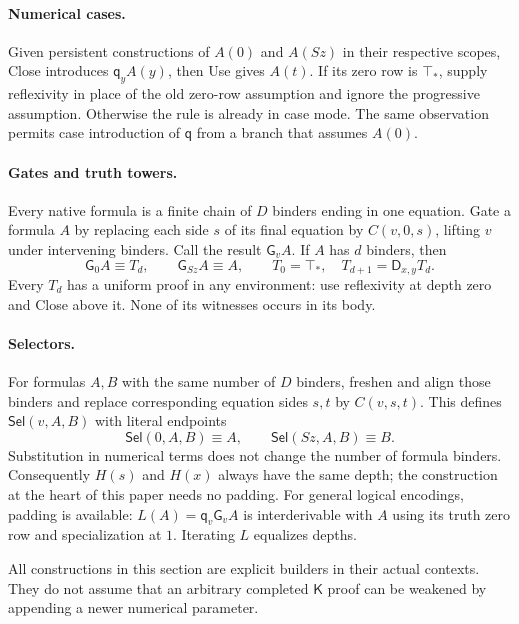 \documentclass[11pt,letterpaper]{article}
\theoremstyle{definition}\newtheorem{definition}[theorem]{Definition}
\theoremstyle{remark}\newtheorem{remark}[theorem]{Remark}
\newcommand{\K}{\mathsf K}
\newcommand{\DD}{\mathsf D}
\newcommand{\qq}{\mathsf q}
\newcommand{\GG}{\mathsf G}
\newcommand{\Sel}{\mathsf{Sel}}
\newcommand{\ttop}{\top_*}
\begin{document}
\paragraph{Numerical cases.}
Given persistent constructions of $A(0)$ and $A(Sz)$ in their respective
scopes, Close introduces $\qq_y A(y)$, then Use gives $A(t)$.
If its zero row is $\ttop$, supply reflexivity in place of the old
zero-row assumption and ignore the progressive assumption. Otherwise
the rule is already in case mode. The same observation permits
case introduction of $\qq$ from a branch that assumes $A(0)$.

\paragraph{Gates and truth towers.}
Every native formula is a finite chain of $D$ binders ending in one
equation. Gate a formula $A$ by replacing each side $s$ of its final
equation by $C(v,0,s)$, lifting $v$ under intervening binders. Call the
result $\GG_v A$. If $A$ has $d$ binders, then
\[
 \GG_0 A\equiv T_d,\qquad \GG_{Sz}A\equiv A,\qquad
 T_0=\ttop,\quad T_{d+1}=\DD_{x,y}T_d.
\]
Every $T_d$ has a uniform proof in any environment: use reflexivity at
depth zero and Close above it. None of its witnesses occurs in its body.

\paragraph{Selectors.}
For formulas $A,B$ with the same number of $D$ binders, freshen and align
those binders and replace corresponding equation sides $s,t$ by
$C(v,s,t)$. This defines $\Sel(v,A,B)$ with literal endpoints
\[
              \Sel(0,A,B)\equiv A,\qquad
              \Sel(Sz,A,B)\equiv B.
\]
Substitution in numerical terms does not change the number of formula
binders. Consequently $H(s)$ and $H(x)$ always have the same depth;
the construction at the heart of this paper needs no padding.
For general logical encodings, padding is available:
$L(A)=\qq_v\GG_v A$ is interderivable with $A$ using its truth zero
row and specialization at $1$. Iterating $L$ equalizes depths.

All constructions in this section are explicit builders in their actual
contexts. They do not assume that an arbitrary completed $\K$ proof can
be weakened by appending a newer numerical parameter.
\end{document}

